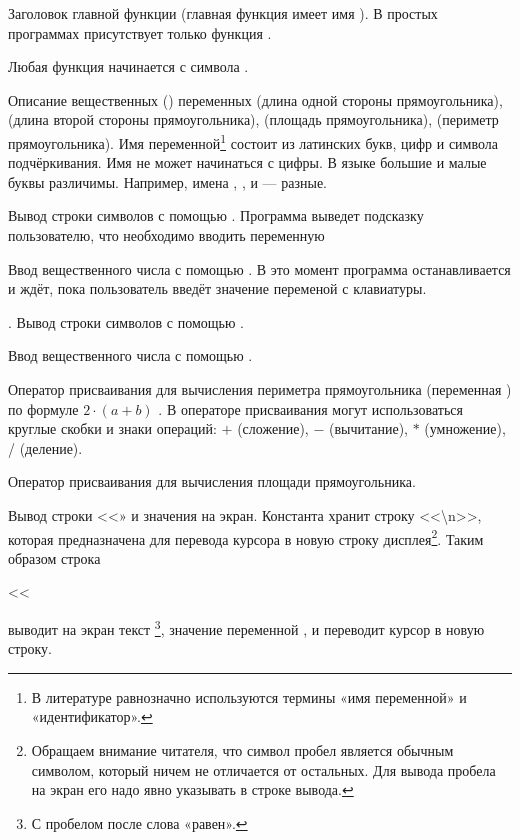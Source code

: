  Заголовок главной функции (главная функция имеет имя ). В простых программах
присутствует только функция .

 Любая функция начинается с символа \Sys{\{}.

 Описание вещественных () переменных  (длина одной стороны
прямоугольника),  (длина второй стороны прямоугольника),  (площадь
прямоугольника),  (периметр прямоугольника). Имя переменной\footnote{В 
литературе равнозначно используются термины «имя переменной» и
«идентификатор».} состоит из латинских букв, цифр и символа подчёркивания. Имя не может начинаться
с цифры. В языке  большие и малые буквы различимы. Например, имена ,
,  и  --- разные.

 Вывод строки символов  с помощью . Программа выведет
подсказку пользователю, что необходимо вводить переменную 

 Ввод вещественного числа  с помощью . В это момент
программа останавливается и ждёт, пока пользователь введёт значение переменой  с клавиатуры.

. Вывод строки символов  с помощью .

 Ввод вещественного числа  с помощью .

 Оператор присваивания для вычисления периметра прямоугольника (переменная ) по
формуле  $2\cdot(a+b)$ . В операторе присваивания могут использоваться круглые скобки и знаки операций: $+$ (сложение),
$-$ (вычитание), $*$ (умножение), / (деление).

 Оператор присваивания для вычисления площади прямоугольника.

 Вывод строки <<» и значения  на экран. Константа
 хранит строку <<\textbackslash{n}>>, которая предназначена для
перевода курсора в новую строку дисплея\footnote{Обращаем внимание читателя, что символ пробел является обычным
символом, который ничем не отличается от остальных. Для вывода пробела на экран его надо явно указывать в строке
вывода.}. Таким образом строка 

 {<}{<}  

выводит на экран текст \footnote{С пробелом после слова
«равен».}, значение переменной , и переводит курсор в новую строку.


